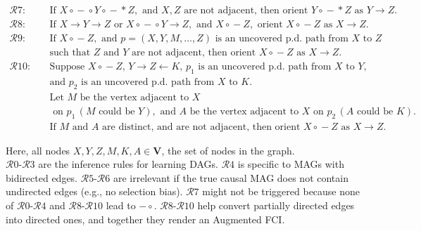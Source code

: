 \documentclass[main.tex]{subfiles}
\begin{document}
\begin{align*}
\mathcal{R}7: \quad & \text{If } X \circ\!\!-\!\!\circ Y \circ\!\!-\!\!\ast Z, \text{ and } X, Z \text{ are not adjacent, then orient } Y \circ\!\!-\!\!\ast Z \text{ as } Y \rightarrow Z. \\[1em]
\mathcal{R}8: \quad & \text{If } X \rightarrow Y \rightarrow Z \text{ or } X \circ\!\!-\!\!\circ Y \rightarrow Z, \text{ and } X \circ\!\!-\!\!Z, \text{ orient } X \circ\!\!-\!\!Z \text{ as } X \rightarrow Z. \\[1em]
\mathcal{R}9: \quad & \text{If } X \circ\!\!-\!\!Z, \text{ and } p = (X, Y, M, \ldots, Z) \text{ is an uncovered p.d. path from } X \text{ to } Z \\
& \text{such that } Z \text{ and } Y \text{ are not adjacent, then orient } X \circ\!\!-\!\!Z \text{ as } X \rightarrow Z. \\[1em]
\mathcal{R}10: \quad & \text{Suppose } X \circ\!\!-\!\!Z,\, Y \rightarrow Z \leftarrow K,\, p_1 \text{ is an uncovered p.d. path from } X \text{ to } Y, \\
& \text{and } p_2 \text{ is an uncovered p.d. path from } X \text{ to } K. \\
& \text{Let } M \text{ be the vertex adjacent to }X \\ & \text{ on } p_1\, (M \text{ could be } Y), \text{ and } A \text{ be the vertex adjacent to } X \text{ on } p_2\, (A \text{ could be } K). \\
& \text{If } M \text{ and } A \text{ are distinct, and are not adjacent, then orient } X \circ\!\!-\!\!Z \text{ as } X \rightarrow Z.
\end{align*}

\noindent
Here, all nodes \( X, Y, Z, M, K, A \in \mathbf{V} \), the set of nodes in the graph.\\
\(\mathcal{R}0\)-\(\mathcal{R}3\) are the inference rules for learning DAGs. \(\mathcal{R}4\) is specific to MAGs with bidirected edges. \(\mathcal{R}5\)-\(\mathcal{R}6\) are irrelevant if the true causal MAG does not contain undirected edges (e.g., no selection bias). \(\mathcal{R}7\) might not be triggered because none of \(\mathcal{R}0\)-\(\mathcal{R}4\) and \(\mathcal{R}8\)-\(\mathcal{R}10\) lead to \( -\!\!\circ \). \(\mathcal{R}8\)-\(\mathcal{R}10\) help convert partially directed edges into directed ones, and together they render an Augmented FCI\cite{ZHANG20081873}.
\end{document}
